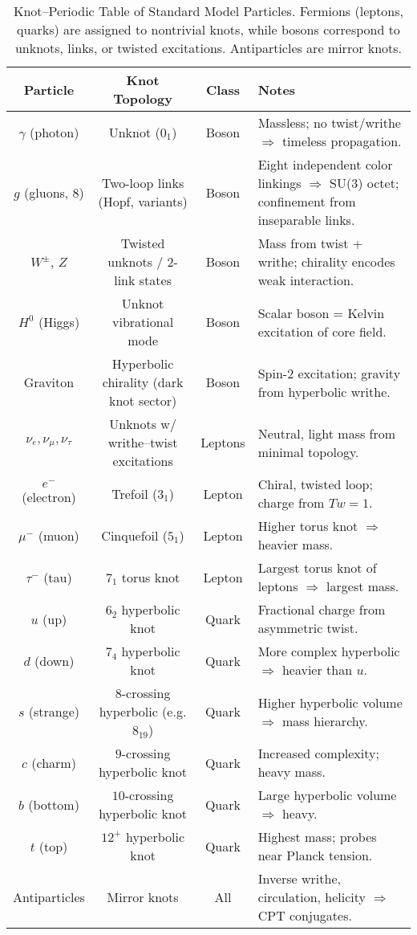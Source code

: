 \documentclass[12pt]{article}
\begin{document}
{{\begin{table}[h]
\centering
\caption{Knot--Periodic Table of Standard Model Particles. Fermions (leptons, quarks) are assigned to nontrivial knots, while bosons correspond to unknots, links, or twisted excitations. Antiparticles are mirror knots.}
\label{tab:knot_periodic}
\begin{tabular}{|c|c|c|p{7.5cm}|}
\hline
\textbf{Particle} & \textbf{Knot Topology} & \textbf{Class} & \textbf{Notes} \\
\hline
$\gamma$ (photon) & Unknot ($0_1$) & Boson & Massless; no twist/writhe $\Rightarrow$ timeless propagation. \\
$g$ (gluons, 8) & Two-loop links (Hopf, variants) & Boson & Eight independent color linkings $\Rightarrow$ SU(3) octet; confinement from inseparable links. \\
$W^\pm$, $Z$ & Twisted unknots / 2-link states & Boson & Mass from twist + writhe; chirality encodes weak interaction. \\
$H^0$ (Higgs) & Unknot vibrational mode & Boson & Scalar boson = Kelvin excitation of core field. \\
Graviton & Hyperbolic chirality (dark knot sector) & Boson & Spin-2 excitation; gravity from hyperbolic writhe. \\
\hline
$\nu_e,\nu_\mu,\nu_\tau$ & Unknots w/ writhe--twist excitations & Leptons & Neutral, light mass from minimal topology. \\
$e^-$ (electron) & Trefoil ($3_1$) & Lepton & Chiral, twisted loop; charge from $Tw=1$. \\
$\mu^-$ (muon) & Cinquefoil ($5_1$) & Lepton & Higher torus knot $\Rightarrow$ heavier mass. \\
$\tau^-$ (tau) & $7_1$ torus knot & Lepton & Largest torus knot of leptons $\Rightarrow$ largest mass. \\
\hline
$u$ (up) & $6_2$ hyperbolic knot & Quark & Fractional charge from asymmetric twist. \\
$d$ (down) & $7_4$ hyperbolic knot & Quark & More complex hyperbolic $\Rightarrow$ heavier than $u$. \\
$s$ (strange) & $8$-crossing hyperbolic (e.g. $8_{19}$) & Quark & Higher hyperbolic volume $\Rightarrow$ mass hierarchy. \\
$c$ (charm) & $9$-crossing hyperbolic knot & Quark & Increased complexity; heavy mass. \\
$b$ (bottom) & $10$-crossing hyperbolic knot & Quark & Large hyperbolic volume $\Rightarrow$ heavy. \\
$t$ (top) & $12^+$ hyperbolic knot & Quark & Highest mass; probes near Planck tension. \\
\hline
Antiparticles & Mirror knots & All & Inverse writhe, circulation, helicity $\Rightarrow$ CPT conjugates. \\
\hline
\end{tabular}
\end{table}

}}
\end{document}
